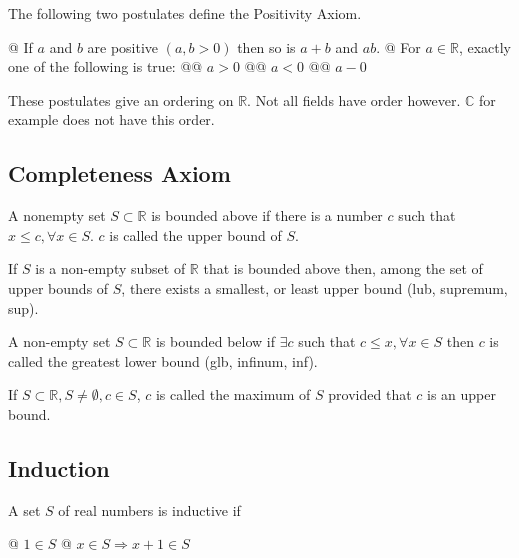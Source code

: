     The following two postulates define the Positivity Axiom.

    \begin{definition}[Positivity]
        \begin{easylist}[enumerate]
            @ If $a$ and $b$ are positive $(a, b > 0)$ then so is $a + b$ and $ab$.
            @ For $a \in \mathbb{R}$, exactly one of the following is true:
            @@ $a > 0$
            @@ $a < 0$
            @@ $a - 0$
        \end{easylist}
    \end{definition}

    These postulates give an ordering on $\mathbb{R}$. Not all fields have order however. $\mathbb{C}$ for example does
    not have this order.

    \subsection{Completeness Axiom}

        A nonempty set $S \subset \mathbb{R}$ is bounded above if there is a number $c$ such that $x \le c, \forall x \in
        S$. $c$ is called the upper bound of $S$.

        \begin{definition}[Completeness]
            If $S$ is a non-empty subset of $\mathbb{R}$ that is bounded above then, among the set of upper bounds of
            $S$, there exists a smallest, or least upper bound (lub, supremum, sup).

            A non-empty set $S \subset \mathbb{R}$ is bounded below if $\exists c$ such that $c \le x, \forall x \in S$
            then $c$ is called the greatest lower bound (glb, infinum, inf).
        \end{definition}

        \begin{definition}[Maximum]
            If $S \subset \mathbb{R}, S \neq \emptyset, c \in S$, $c$ is called the maximum of $S$ provided that $c$ is
            an upper bound.
        \end{definition}

    \subsection{Induction}

    \begin{definition}[Inductive]
        A set $S$ of real numbers is inductive if

        \begin{easylist}[enumerate]
            @ $1 \in S$
            @ $x \in S \Rightarrow x + 1 \in S$
        \end{easylist}
    \end{definition}

